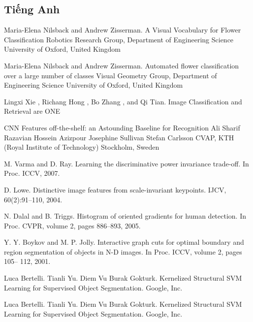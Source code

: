 \documentclass[12pt]{report}
\begin{document}
		\begin{thebibliography}{9}
																								
			\section*{Tiếng Anh}
																					
			Maria-Elena Nilsback and Andrew Zisserman. A Visual Vocabulary for Flower Classification Robotics Research Group, Department of Engineering Science University of Oxford, United Kingdom													
																								
			Maria-Elena Nilsback and Andrew Zisserman. Automated flower classification over a large number of classes Visual Geometry Group, Department of Engineering Science University of Oxford, United Kingdom
																					
			Lingxi Xie , Richang Hong , Bo Zhang , and Qi Tian. Image Classification and Retrieval are ONE
																					
			CNN Features off-the-shelf: an Astounding Baseline for Recognition Ali Sharif Razavian Hossein Azizpour Josephine Sullivan Stefan Carlsson CVAP, KTH (Royal Institute of Technology) Stockholm, Sweden
																				
			M. Varma and D. Ray. Learning the discriminative power invariance trade-off. In Proc. ICCV, 2007.
															
			D. Lowe. Distinctive image features from scale-invariant keypoints. IJCV, 60(2):91–110, 2004.
																							
			N. Dalal and B. Triggs. Histogram of oriented gradients for human detection. In Proc. CVPR, volume 2, pages 886–893, 2005.
																					
			Y. Y. Boykov and M. P. Jolly. Interactive graph cuts for optimal boundary and region segmentation of objects in N-D images. In Proc. ICCV, volume 2, pages 105– 112, 2001.
																				
			Luca Bertelli. Tianli Yu. Diem Vu Burak Gokturk. Kernelized Structural SVM Learning for Supervised Object Segmentation. Google, Inc.
																		
			Luca Bertelli. Tianli Yu. Diem Vu Burak Gokturk. Kernelized Structural SVM Learning for Supervised Object Segmentation. Google, Inc.
																		

\end{thebibliography}
\end{document}
